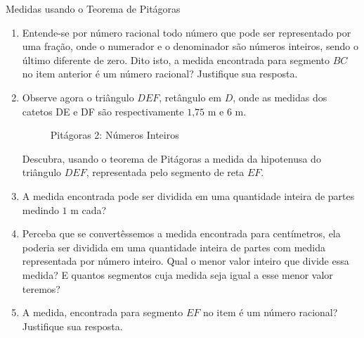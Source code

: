 \begin{task}{Medidas usando o Teorema de Pitágoras}
\begin{enumerate}
\item {} 
Entende-se por número racional todo número que pode ser representado por uma fração, onde o numerador e o denominador são números inteiros, sendo o último diferente de zero. Dito isto, a medida encontrada para segmento $BC$ no item anterior é um número racional? Justifique sua resposta.

\item {} 
Observe agora o triângulo $DEF$, retângulo em $D$, onde as medidas dos catetos DE e DF são respectivamente $1\text{,}75$ m e $6$ m.

\begin{figure}[H]
\centering
\capstart

\caption{Pitágoras 2: Números Inteiros}\label{\detokenize{NO103-5:id7}}\label{\detokenize{NO103-5:id17}}\end{figure}

Descubra, usando o teorema de Pitágoras a medida da hipotenusa do triângulo $DEF$, representada pelo segmento de reta $EF$.

\item {} 
A medida encontrada pode ser dividida em uma quantidade inteira de partes medindo $1$ m cada?

\item {} 
Perceba que se convertêssemos a medida encontrada para centímetros, ela poderia ser dividida em uma quantidade inteira de partes com medida representada por número inteiro. Qual o menor valor inteiro que divide essa medida? E quantos segmentos cuja medida seja igual a esse menor valor teremos?

\item {} 
A medida, encontrada para segmento $EF$ no item   é um número racional? Justifique sua resposta.

\end{enumerate}
\end{task}

